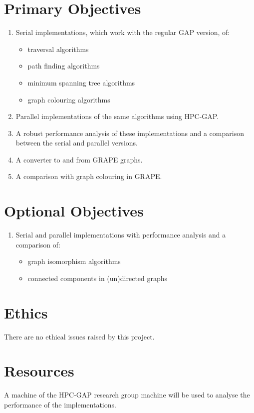 \documentclass{article}
\begin{document}
\section{Primary Objectives}
\begin{enumerate}
  \item Serial implementations, which work with the regular GAP version, of:
  \begin{itemize}
    \item traversal algorithms
    \item path finding algorithms
    \item minimum spanning tree algorithms
    \item graph colouring algorithms
  \end{itemize}
  \item Parallel implementations of the same algorithms using HPC-GAP.
  \item A robust performance analysis of these implementations and a comparison between the serial and parallel versions.
  \item A converter to and from GRAPE graphs.
  \item A comparison with graph colouring in GRAPE.
\end{enumerate}
\section{Optional Objectives}
\begin{enumerate}
  \item Serial and parallel implementations with performance analysis and a comparison of:
  \begin{itemize}
    \item graph isomorphism algorithms
    \item connected components in (un)directed graphs
  \end{itemize}
\end{enumerate}
\section{Ethics}
There are no ethical issues raised by this project.
\section{Resources}
A machine of the HPC-GAP research group machine will be used to analyse the performance of the implementations.


\end{document}
